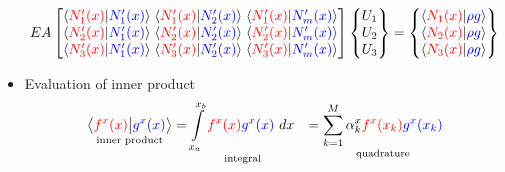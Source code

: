 \documentclass{beamer}
\begin{document}
\begin{frame}[allowframebreaks]
\begin{itemize}
\begin{scriptsize}
  \begin{equation}\nonumber
    \setlength\arraycolsep{1.5pt}
    {EA}
    \begin{bmatrix}
      \left \langle {\color{red}{N_1^\prime(x)}} \vert {\color{blue}{N_1^\prime(x)}} \right \rangle &  \left \langle {\color{red}{N_1^\prime(x)}} \vert {\color{blue}{N_2^\prime(x)}} \right \rangle & \left \langle {\color{red}{N_1^\prime(x)}} \vert {\color{blue}{N_m^\prime(x)}} \right \rangle \\
      \left \langle {\color{red}{N_2^\prime(x)}} \vert {\color{blue}{N_1^\prime(x)}} \right \rangle &  \left \langle {\color{red}{N_2^\prime(x)}} \vert {\color{blue}{N_2^\prime(x)}} \right \rangle & \left \langle {\color{red}{N_2^\prime(x)}} \vert {\color{blue}{N_m^\prime(x)}} \right \rangle \\
      \left \langle {\color{red}{N_3^\prime(x)}} \vert {\color{blue}{N_1^\prime(x)}} \right \rangle &  \left \langle {\color{red}{N_3^\prime(x)}} \vert {\color{blue}{N_2^\prime(x)}} \right \rangle & \left \langle {\color{red}{N_3^\prime(x)}} \vert {\color{blue}{N_m^\prime(x)}} \right \rangle \\
    \end{bmatrix}
    \begin{Bmatrix}
      U_1 \\
      U_2 \\
      U_3 \\
    \end{Bmatrix}=
    \begin{Bmatrix}
      \left \langle {\color{red}{N_1(x)}} \vert {\color{blue}{\rho g}} \right \rangle \\
      \left \langle {\color{red}{N_2(x)}} \vert {\color{blue}{\rho g}} \right \rangle \\
      \left \langle {\color{red}{N_3(x)}} \vert {\color{blue}{\rho g}} \right \rangle \\ 
    \end{Bmatrix}    
  \end{equation}
\end{scriptsize}

\item Evaluation of  inner product
  \begin{equation}\nonumber
    \begin{aligned}
      \underset{\text{inner~product}}{\left\langle {\color{red}{f^x(x)}} \big\vert  {\color{blue}{g^x(x)}} \right\rangle} &= \underset{\text{integral}}{\int\limits_{x_a}^{x_b}  {\color{red}{f^x(x)}}  {\color{blue}{g^x(x)}}~dx} &= \underset{\text{quadrature}}{\sum_{k=1}^M \alpha_k^x  {\color{red}{f^x(x_k)}}  {\color{blue}{g^x(x_k)}}}\\
    \end{aligned}
  \end{equation}  


\end{itemize}
\end{frame}
\end{document}
